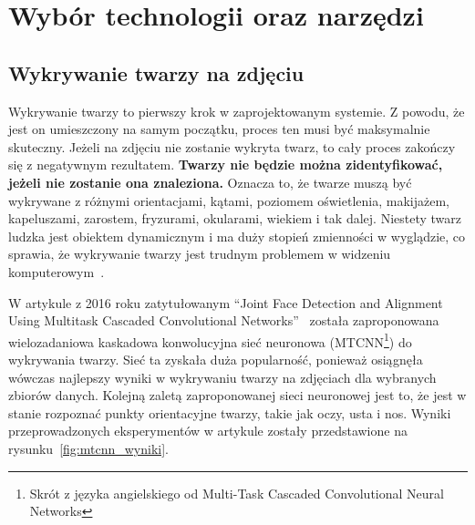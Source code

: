 \chapter{Wybór technologii oraz narzędzi}


\section{Wykrywanie twarzy na zdjęciu}

Wykrywanie twarzy to pierwszy krok w zaprojektowanym systemie.
Z powodu, że jest on umieszczony na samym początku, proces ten musi być maksymalnie skuteczny.
Jeżeli na zdjęciu nie zostanie wykryta twarz, to cały proces zakończy się z negatywnym rezultatem.
\textbf{Twarzy nie będzie można zidentyfikować, jeżeli nie zostanie ona znaleziona.}
Oznacza to, że twarze muszą być wykrywane z różnymi orientacjami, kątami,
poziomem oświetlenia, makijażem, kapeluszami, zarostem, fryzurami, okularami, wiekiem i tak dalej.
Niestety twarz ludzka jest obiektem dynamicznym i ma duży stopień zmienności w wyglądzie,
co sprawia, że wykrywanie twarzy jest trudnym problemem w widzeniu komputerowym~\cite{HJELMAS2001236}.

W artykule z 2016 roku zatytułowanym
``Joint Face Detection and Alignment Using Multitask Cascaded Convolutional Networks''~\cite{zhang2016joint}
została zaproponowana wielozadaniowa kaskadowa konwolucyjna sieć neuronowa
(MTCNN\footnote{Skrót z języka angielskiego od Multi-Task Cascaded Convolutional Neural Networks })
do wykrywania twarzy.
Sieć ta zyskała duża popularność, ponieważ osiągnęła wówczas najlepszy wyniki
w wykrywaniu twarzy na zdjęciach dla wybranych zbiorów danych.
Kolejną zaletą zaproponowanej sieci neuronowej jest to, że jest w stanie
rozpoznać punkty orientacyjne twarzy, takie jak oczy, usta i nos.
Wyniki przeprowadzonych eksperymentów w artykule zostały przedstawione na rysunku~\ref{fig:mtcnn_wyniki}.

